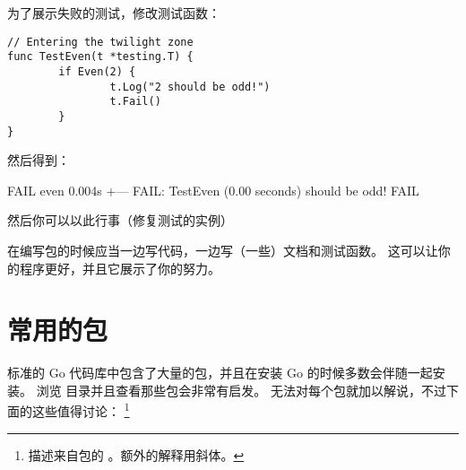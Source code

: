 为了展示失败的测试，修改测试函数：
\begin{lstlisting}
// Entering the twilight zone
func TestEven(t *testing.T) {
        if Even(2) {
                t.Log("2 should be odd!")
                t.Fail()
        }   
}
\end{lstlisting}
然后得到：
\begin{display}
FAIL    even    0.004s
+--- FAIL: TestEven (0.00 seconds)
\qquad{} should be odd!
FAIL
\end{display}
\noindent{}然后你可以以此行事（修复测试的实例）

\begin{lbar}
在编写包的时候应当一边写代码，一边写（一些）文档和测试函数。
这可以让你的程序更好，并且它展示了你的努力。
\end{lbar}

\section{常用的包}
标准的 Go 代码库中包含了大量的包，并且在安装 Go 的时候多数会伴随一起安装。
浏览  目录并且查看那些包会非常有启发。
无法对每个包就加以解说，不过下面的这些值得讨论：
\footnote{描述来自包的 。额外的解释用斜体。}

